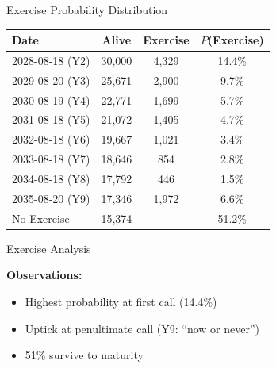 \documentclass[aspectratio=169,11pt]{beamer}
\begin{document}
\begin{frame}{Exercise Probability Distribution}
\begin{center}
\begin{tabular}{lccc}
\toprule
\textbf{Date} & \textbf{Alive} & \textbf{Exercise} & $P$(Exercise) \\
\midrule
2028-08-18 (Y2) & 30,000 & 4,329 & 14.4\% \\
2029-08-20 (Y3) & 25,671 & 2,900 & 9.7\% \\
2030-08-19 (Y4) & 22,771 & 1,699 & 5.7\% \\
2031-08-18 (Y5) & 21,072 & 1,405 & 4.7\% \\
2032-08-18 (Y6) & 19,667 & 1,021 & 3.4\% \\
2033-08-18 (Y7) & 18,646 & 854 & 2.8\% \\
2034-08-18 (Y8) & 17,792 & 446 & 1.5\% \\
2035-08-20 (Y9) & 17,346 & 1,972 & 6.6\% \\
No Exercise & 15,374 & -- & 51.2\% \\
\bottomrule
\end{tabular}
\end{center}
\end{frame}

\begin{frame}{Exercise Analysis}
\begin{center}
\end{center}

\textbf{Observations:}
\begin{itemize}
    \item Highest probability at first call (14.4\%)
    \item Uptick at penultimate call (Y9: ``now or never'')
    \item 51\% survive to maturity
\end{itemize}
\end{frame}
\end{document}
